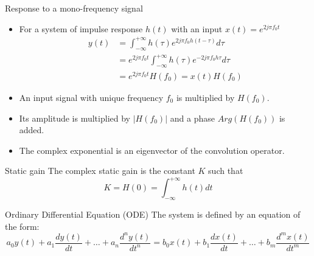   \begin{block}{Response to a mono-frequency signal}
    \begin{itemize}
    \item For a system of impulse response $h(t)$ with an input $x(t)=e^{2j\pi f_0 t}$
\begin{align*}
  y(t) &= \int_{-\infty}^{+\infty}h(\tau)e^{2j\pi f_0 h(t-\tau)}d\tau\\
&= e^{2j\pi f_0 t} \int_{-\infty}^{+\infty}h(\tau)e^{- 2 j\pi f_0
  h\tau}d\tau\\
&=e^{2j\pi f_0 t} H(f_0)=x(t)H(f_0)
\end{align*}
\item An input signal with unique frequency $f_0$ is multiplied by $H(f_0)$.
\item Its amplitude is multiplied by $|H(f_0)|$ and a phase $Arg(H(f_0))$ is added.
\item The complex exponential is an eigenvector of the convolution operator.
    \end{itemize}

  \end{block}

\begin{block}{Static gain}
  The complex static gain is the constant $K$ such that
  \begin{equation*}
    K=H(0)=\int_{-\infty}^{+\infty}h(t)dt
  \end{equation*}
\end{block}



\begin{block}{Ordinary Differential Equation (ODE)}
    The system is defined by an equation of the form:
    \begin{equation}
      \label{eq:edo2}
      a_0y(t)+a_1\frac{dy(t)}{dt}+\dots+a_n\frac{d^ny(t)}{dt^n}=
      b_0x(t)+b_1\frac{dx(t)}{dt} +\dots+b_m\frac{d^mx(t)}{dt^m}
    \end{equation}
    
    
    
    \end{block}
    
